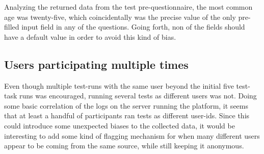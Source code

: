 
  Analyzing the returned data from the test pre-questionnaire, the most common
  age was twenty-five, which coincidentally was the precise value of the only
  pre-filled input field in any of the questions. Going forth, non of the
  fields should have a default value in order to avoid this kind of bias.


  \subsection{Users participating multiple times}

  Even though multiple test-runs with the same user beyond the initial five
  test-task runs was encouraged, running several tests as different users was
  not. Doing some basic correlation of the logs on the server running the
  platform, it seems that at least a handful of participants ran tests as
  different user-ids. Since this could introduce some unexpected biases to the
  collected data, it would be interesting to add some kind of flagging
  mechanism for when many different users appear to be coming from the same
  source, while still keeping it anonymous.

